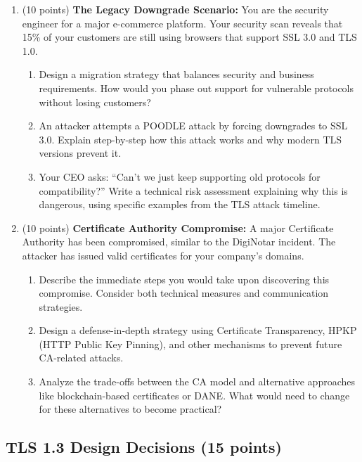 \documentclass[10pt,a4paper,american]{exam}
\begin{document}
\begin{enumerate}
	\item (10 points) \textbf{The Legacy Downgrade Scenario:}
	      You are the security engineer for a major e-commerce platform. Your security scan reveals that 15\% of your customers are still using browsers that support SSL 3.0 and TLS 1.0.
	      \begin{enumerate}
		      \item Design a migration strategy that balances security and business requirements. How would you phase out support for vulnerable protocols without losing customers?
		      \item An attacker attempts a POODLE attack by forcing downgrades to SSL 3.0. Explain step-by-step how this attack works and why modern TLS versions prevent it.
		      \item Your CEO asks: ``Can't we just keep supporting old protocols for compatibility?'' Write a technical risk assessment explaining why this is dangerous, using specific examples from the TLS attack timeline.
	      \end{enumerate}
	\item (10 points) \textbf{Certificate Authority Compromise:}
	      A major Certificate Authority has been compromised, similar to the DigiNotar incident. The attacker has issued valid certificates for your company's domains.
	      \begin{enumerate}
		      \item Describe the immediate steps you would take upon discovering this compromise. Consider both technical measures and communication strategies.
		      \item Design a defense-in-depth strategy using Certificate Transparency, HPKP (HTTP Public Key Pinning), and other mechanisms to prevent future CA-related attacks.
		      \item Analyze the trade-offs between the CA model and alternative approaches like blockchain-based certificates or DANE. What would need to change for these alternatives to become practical?
	      \end{enumerate}
\end{enumerate}

\subsection{TLS 1.3 Design Decisions (15 points)}
\end{document}

